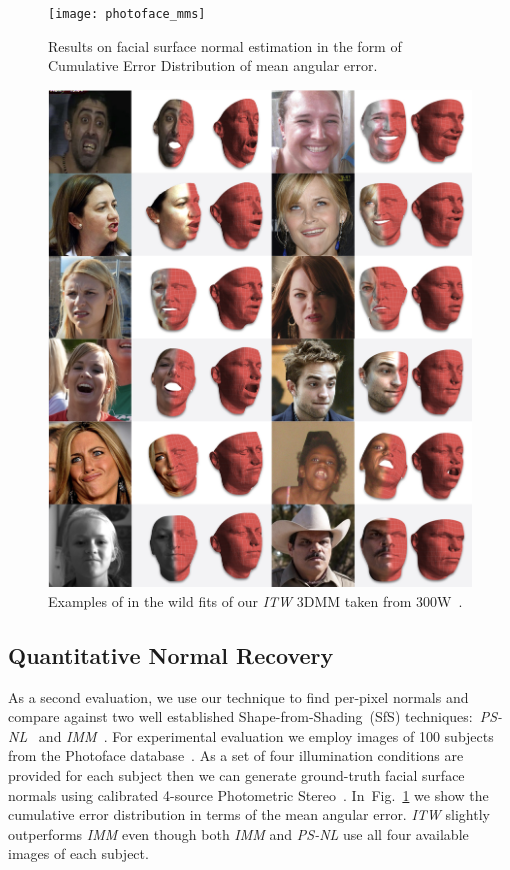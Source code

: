 \begin{figure}[!t]
    \centering
    \texttt{[image: photoface\_mms]}
    \caption{Results on facial surface normal estimation in the form of Cumulative Error Distribution of mean angular error.}
\label{fig:angular_normals_ced}
\end{figure}


\begin{figure}
\centering
\includegraphics[width=0.95\linewidth]{example_gallery}
\caption{Examples of in the wild fits of our \emph{ITW} 3DMM taken from 300W~\cite{sagonas2016faces}.}
\label{fig:example_gallery}
\end{figure}


\subsection{Quantitative Normal Recovery}
\label{sec:experiments-quantitative-normals}
As a second evaluation, we use our technique to find per-pixel normals and compare against two well established Shape-from-Shading~(SfS) techniques:~\textit{PS-NL}~\cite{basri2007photometric} and \textit{IMM}~\cite{kemelmacher2013internet}. For experimental evaluation we employ images of 100 subjects from the Photoface database~\cite{photoface}. As a set of four illumination conditions are provided for each subject then we can generate ground-truth facial surface normals using calibrated 4-source Photometric Stereo~\cite{marr1978representation}. In~Fig.~\ref{fig:angular_normals_ced} we show the cumulative error distribution in terms of the mean angular error. \textit{ITW} slightly outperforms \textit{IMM} even though both \textit{IMM} and \textit{PS-NL} use all four available images of each subject.

%

%


%
%
%
%
%
%
%
%
%
